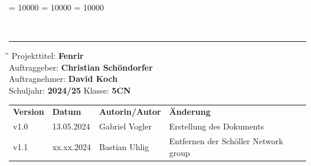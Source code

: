 \documentclass[
	headings=optiontotocandhead,%
	oneside,
	numbers=noenddot,%
	toc=flat, %
	10pt, %
	parskip=full, %
	listof=totoc, %
	listof=flat, %
	numbers=noenddot, %
	bibliography=totoc, %
	a4paper,DIV=14,
]{scrartcl}
\newcommand\Tstrut{\rule{0pt}{3.2ex}}         %
\newcommand\Bstrut{\rule[-1.5ex]{0pt}{0pt}}   %
\newenvironment{nstabbing}
	{\setlength{\topsep}{-\parskip}
		\setlength{\partopsep}{-\parskip}
		\tabbing}
	{\endtabbing}
\begin{document}
\clubpenalty = 10000 %
\widowpenalty = 10000 %
\displaywidowpenalty = 10000

{\sffamily{\textbf{\LARGE{\textcolor{orange}{Stakeholderanalyse}}}}}\\
\noindent\rule{\textwidth}{0.1pt}
\begin{nstabbing}
	\hspace{4cm}\=\hspace{4cm}\=\hspace{4cm}\=\kill
	Projekttitel: \> \textbf{Fenrir}\\
	Auftraggeber: \> \textbf{Christian Schöndorfer}\\
	Auftragnehmer: \> \textbf{David Koch}\\
	Schuljahr: \> \textbf{2024/25}
	\> Klasse: \> \textbf{5CN}\\
\end{nstabbing}
{\smaller
	\begin{tabularx}{\textwidth}{l l l l}
	\hline
	\textbf{Version} & \textbf{Datum} & \textbf{Autorin/Autor} & \textbf{Änderung}\Tstrut  \\
	v1.0 & 13.05.2024 & Gabriel Vogler & Erstellung des Dokuments  
\Tstrut \\
	v1.1 & xx.xx.2024 & Bastian Uhlig & Entfernen der Schöller Network group	
\Bstrut \\
	\hline
	\end{tabularx}
}
\end{document}
